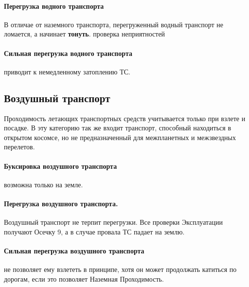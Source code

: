 \paragraph{Перегрузка водного транспорта} В отличае от наземного транспорта, перегруженный водный транспорт не ломается, а начинает \textbf{тонуть}.
\tbd проверка неприятностей
\paragraph{Сильная перегрузка водного транспорта} приводит к немедленному затоплению ТС.


\subsection{Воздушный транспорт}
Проходимость летающих транспортных средств учитывается только при взлете и посадке. В эту категорию так же входит транспорт, способный находиться в открытом косомсе, но не предназначенный для межпланетных и межзвездных перелетов.
\paragraph{Буксировка воздушного транспорта} возможна только на земле.
\paragraph{Перегрузка воздушного транспорта.} Воздушный транспорт не терпит перегрузки. Все проверки Эксплуатации получают Осечку 9, а в случае провала ТС падает на землю.
\paragraph{Сильная перегрузка воздушного транспорта} не позволяет ему взлететь в принципе, хотя он может продолжать катиться по дорогам, если это позволяет Наземная Проходимость.


